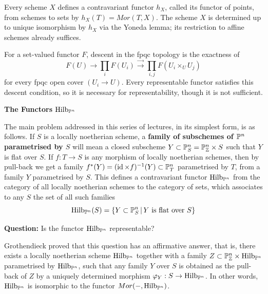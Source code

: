




\begin{definition}\label{nhq-functor-of-points}
Every scheme $X$ defines a contravariant functor $h_X$, called its functor
of points, from schemes to sets by $h_X(T)=Mor(T,X)$. The scheme $X$ is
determined up to unique isomorphism by $h_X$ via the Yoneda lemma; its
restriction to affine schemes already suffices.
\end{definition}

\begin{definition}\label{nhq-fpqc-descent}
For a set-valued functor $F$, descent in the fpqc topology is the exactness
of
$$F(U)\longrightarrow \prod_i F(U_i)
\stackrel{\to}{\scriptstyle\to}\prod_{i,j}F(U_i\times_U U_j)$$
for every fpqc open cover $(U_i\to U)$. Every representable functor
satisfies this descent condition, so it is necessary for representability,
though it is not sufficient.
\end{definition}

\centerline{\large\bf The Functors $\operatorname{Hilb}_{\mathbb{P}^n}$}


\medskip

\begin{definition}\label{nhq-hilbert-functor}
The main problem addressed in this series of lectures, in its simplest
form, is as follows. If $S$ is a locally noetherian scheme,
a \textbf{family of subschemes of $\mathbb{P}^n$ parametrised by $S$} will mean
a closed subscheme $Y \subset \mathbb{P}^n_S = \mathbb{P}^n_{\mathbb{Z}}\times S$
such that $Y$ is flat over $S$.
If $f: T\to S$ is any morphism of locally noetherian schemes, then
by pull-back we get a family $f^*(Y) = (\operatorname{id} \times f)^{-1}(Y)
\subset \mathbb{P}^n_T$
parametrised by $T$, from a family $Y$ parametrised by $S$.
This defines a contravariant functor $\operatorname{Hilb}_{\mathbb{P}^n}$
from the category of all locally noetherian schemes to the category of sets,
which associates to any $S$ the set of all such families
$$\operatorname{Hilb}_{\mathbb{P}^n}(S) = \{ Y \subset \mathbb{P}^n_S \,|\,
Y \mbox{ is flat over }S \}$$
\end{definition}

\textbf{Question:} Is the functor $\operatorname{Hilb}_{\mathbb{P}^n}$ representable?

\begin{theorem*}\label{nhq-hilbert-representability}
Grothendieck proved that this question has an affirmative answer, that is,
there exists a locally noetherian scheme $\operatorname{Hilb}_{\mathbb{P}^n}$ together with
a family $Z \subset \mathbb{P}^n_{\mathbb{Z}}\times \operatorname{Hilb}_{\mathbb{P}^n}$
parametrised by $\operatorname{Hilb}_{\mathbb{P}^n}$,
such that any family $Y$ over $S$ is obtained as the
pull-back of $Z$
by a uniquely determined morphism $\varphi_Y : S \to \operatorname{Hilb}_{\mathbb{P}^n}$.
In other words, $\operatorname{Hilb}_{\mathbb{P}^n}$ is isomorphic to
the functor $Mor(-,\operatorname{Hilb}_{\mathbb{P}^n})$.
\end{theorem*}

